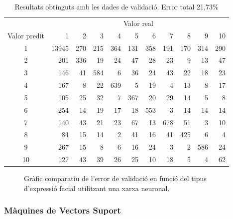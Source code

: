\documentclass[a4paper]{article}
\begin{document}
\begin{table}[H]
	\centering
	\def\arraystretch{1.2}
	\begin{tabular}{|c|rrrrrrrrrr|}
		\hline
		& \multicolumn{10}{c|}{Valor real} \\
		Valor predit & 1 & 2 & 3 & 4 & 5 & 6 & 7 & 8 & 9 & 10 \\
		\hline
		1 & 13945 & 270 & 215 & 364 & 131 & 358 & 191 & 170 & 314 & 290 \\
		2 & 201 & 336 & 19 & 24 & 47 & 28 & 23 & 9 & 13 & 47 \\
		3 & 146 & 41 & 584 & 6 & 36 & 24 & 43 & 22 & 18 & 23 \\
		4 & 167 & 8 & 22 & 639 & 5 & 19 & 4 & 13 & 8 & 17 \\
		5 & 105 & 25 & 32 & 7 & 367 & 20 & 29 & 14 & 5 & 8 \\
		6 & 254 & 14 & 19 & 17 & 18 & 553 & 3 & 14 & 14 & 14 \\
		7 & 140 & 43 & 21 & 23 & 67 & 13 & 678 & 51 & 3 & 10 \\
		8 & 84 & 15 & 14 & 2 & 41 & 16 & 41 & 425 & 6 & 4 \\
		9 & 267 & 15 & 8 & 6 & 16 & 24 & 3 & 2 & 586 & 24 \\
		10 & 127 & 43 & 39 & 26 & 25 & 10 & 18 & 5 & 4 & 62 \\
		\hline
	\end{tabular}
	\caption{Resultats obtinguts amb les dades de validació. Error total 21,73\%}
	\label{tab:nnet_k2}
\end{table}

\begin{figure}[H]
	\centering
	\captionsetup{width=0.8\textwidth}
	\caption{Gràfic comparatiu de l'error de validació en funció del tipus d'expressió facial utilitzant una xarxa neuronal.}
\end{figure}

\subsubsection{Màquines de Vectors Suport}
\end{document}
